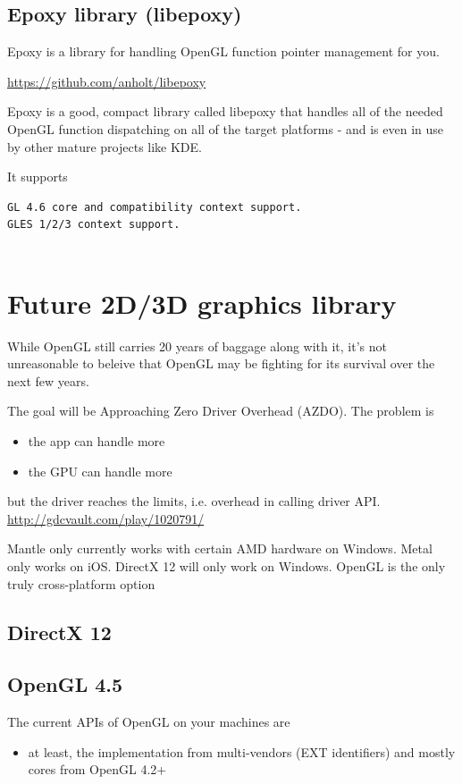 \subsection{Epoxy library (libepoxy)}
\label{sec:libepoxy}
\label{sec:Epoxy-lib}

Epoxy is a library for handling OpenGL function pointer management for you.

\url{https://github.com/anholt/libepoxy}

Epoxy is a good, compact library called libepoxy that handles all of the needed
OpenGL function dispatching on all of the target platforms - and is even in use by
other mature projects like KDE.

It supports
\begin{verbatim}
GL 4.6 core and compatibility context support.
GLES 1/2/3 context support.


\end{verbatim}


\section{Future 2D/3D graphics library}

While OpenGL still carries 20 years of baggage along with it, it's not
unreasonable to beleive that OpenGL may be fighting for its survival over the
next few years.

The goal will be Approaching Zero Driver Overhead (AZDO). The problem is
\begin{itemize}	
  \item the app can handle more
  \item the GPU can handle more
\end{itemize}
but the driver reaches the limits, i.e. overhead in calling driver API.
\url{http://gdcvault.com/play/1020791/}

Mantle only currently works with certain AMD hardware on Windows. Metal only
works on iOS. DirectX 12 will only work on Windows. OpenGL is the only truly
cross-platform option


\subsection{DirectX 12}

\subsection{OpenGL 4.5}

The current APIs of OpenGL on your machines are 
\begin{itemize}
  \item at least, the implementation from multi-vendors (EXT identifiers) and
  mostly cores from OpenGL 4.2+
\end{itemize}

